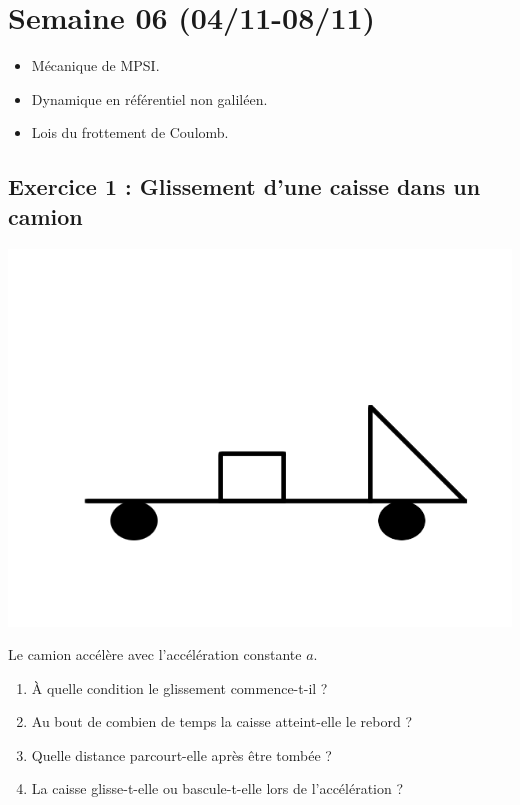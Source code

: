 \section{Semaine 06 (04/11-08/11) }


\begin{itemize}
	\item Mécanique de MPSI.
	\item Dynamique en référentiel non galiléen.
	\item Lois du frottement de Coulomb.
\end{itemize}

\subsection{Exercice 1 : Glissement d'une caisse dans un camion}

\begin{minipage}[c]{\linewidth/2}
	\includegraphics{./Images/mp_s05_ex01.png}
\end{minipage}%
\begin{minipage}[c]{\linewidth/2}
	Le camion accélère avec l'accélération constante $a$.
	\begin{enumerate}
		\item À quelle condition le glissement commence-t-il ?
		\item Au bout de combien de temps la caisse atteint-elle le rebord ?
		\item Quelle distance parcourt-elle après être tombée ?
		\item La caisse glisse-t-elle ou bascule-t-elle lors de l'accélération ?
	\end{enumerate}
\end{minipage}


